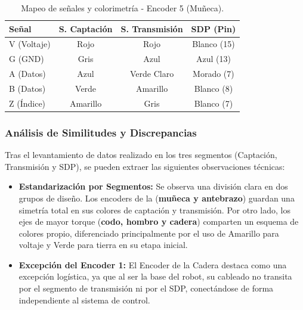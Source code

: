 \begin{table}[h]
	\centering
	\caption{Mapeo de señales y colorimetría - Encoder 5 (Muñeca).}
	\renewcommand{\arraystretch}{1.5}
	\begin{tabular}{lccc}
		\toprule
		\textbf{Señal} & \textbf{S. Captación} & \textbf{S. Transmisión} & \textbf{SDP (Pin)} \\ \midrule
		V (Voltaje)    & Rojo                  & Rojo                    & Blanco (15)        \\
		G (GND)        & Gris                  & Azul                    & Azul (13)          \\
		A (Datos)      & Azul                  & Verde Claro             & Morado (7)         \\
		B (Datos)      & Verde                 & Amarillo                & Blanco (8)         \\
		Z (Índice)     & Amarillo              & Gris                    & Blanco (7)         \\ \bottomrule
	\end{tabular}
\end{table}

\clearpage
\subsubsection{Análisis de Similitudes y Discrepancias}

Tras el levantamiento de datos realizado en los tres segmentos (Captación, Transmisión y SDP), se pueden extraer las siguientes observaciones técnicas:

\begin{itemize}
	\item \textbf{Estandarización por Segmentos:} Se observa una división clara en dos grupos de diseño. Los encoders de la (\textbf{muñeca y antebrazo}) guardan una simetría total en sus colores de captación y transmisión. Por otro lado, los ejes de mayor torque (\textbf{codo, hombro y cadera}) comparten un esquema de colores propio, diferenciado principalmente por el uso de Amarillo para voltaje y Verde para tierra en su etapa inicial.
	
	\item \textbf{Excepción del Encoder 1:} El Encoder de la Cadera destaca como una excepción logística, ya que al ser la base del robot, su cableado no transita por el segmento de transmisión ni por el SDP, conectándose de forma independiente al sistema de control.
\end{itemize}



